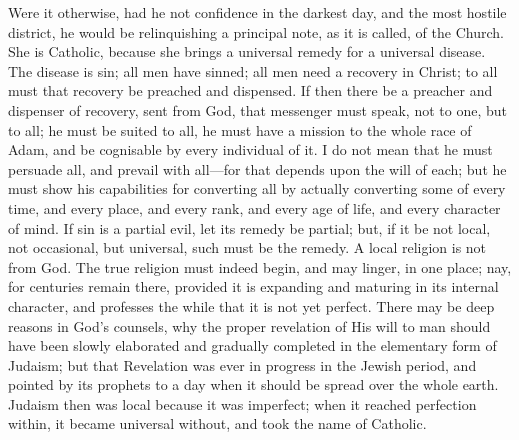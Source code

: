 Were it otherwise, had he not confidence in the darkest day, and
the most hostile district, he would be relinquishing a principal note,
as it is called, of the Church. She is Catholic, because she brings a
universal remedy for a universal disease. The disease is sin; all men
have sinned; all men need a recovery in Christ; to all must that
recovery be preached and dispensed. If then there be a preacher and
dispenser of recovery, sent from God, that messenger must speak, not
to one, but to all; he must be suited to all, he must have a mission
to the whole race of Adam, and be cognisable by every individual of
it. I do not mean that he must persuade all, and prevail with all—for
that depends upon the will of each; but he must show his capabilities
for converting all by actually converting some of every time, and
every place, and every rank, and every age of life, and every
character of mind. If sin is a partial evil, let its remedy be
partial; but, if it be not local, not occasional, but universal, such
must be the remedy. A local religion is not from God. The true
religion must indeed begin, and may linger, in one place; nay, for
centuries remain there, provided it is expanding and maturing in its
internal character, and professes the while that it is not yet
perfect. There may be deep reasons in God's counsels, why the proper
revelation of His will to man should have been slowly elaborated and
gradually completed in the elementary form of Judaism; but that
Revelation was ever in progress in the Jewish period, and pointed by
its prophets to a day when it should be spread over the whole earth.
Judaism then was local because it was imperfect; when it reached
perfection within, it became universal without, and took the name of
Catholic.

